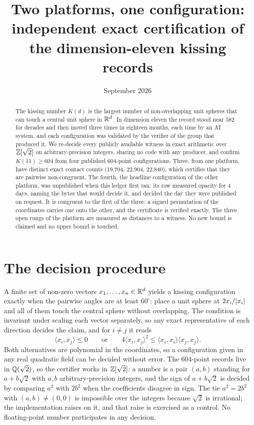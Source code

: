 \documentclass[11pt]{article}
\title{Two platforms, one configuration:\\ independent exact certification of the dimension-eleven kissing records}
\author{\cmauthor}
\date{September 2026}
\begin{document}
\maketitle

\begin{abstract}
The kissing number $K(d)$ is the largest number of non-overlapping unit spheres
that can touch a central unit sphere in $\mathbb{R}^d$. In dimension eleven the record
stood near $582$ for decades and then moved three times in eighteen months, each
time by an AI system, and each configuration was validated by the verifier of
the group that produced it. We re-decide every publicly available witness in
exact arithmetic over $\mathbb{Z}[\sqrt2]$ on arbitrary-precision integers, sharing no
code with any producer, and confirm $K(11) \ge 604$ from four published
$604$-point configurations. Three, from one platform, have distinct exact
contact counts (19,704, 22,904, 22,840),
which certifies that they are pairwise non-congruent. The fourth, the headline
configuration of the other platform, was unpublished when this ledger first
ran: its row measured opacity for 4 days, naming the bytes that
would decide it, and decided the day they were published on request. It is
congruent to the first of the three: a signed permutation of the coordinates
carries one onto the other, and the certificate is verified exactly. The three
open rungs of the platform are measured as distances to a witness. No new
bound is claimed and no upper bound is touched.
\end{abstract}

\section{The decision procedure}

A finite set of non-zero vectors $x_1,\dots,x_n \in \mathbb{R}^d$ yields a kissing
configuration exactly when the pairwise angles are at least $60^\circ$: place a
unit sphere at $2x_i/\lvert x_i \rvert$ and all of them touch the central sphere without
overlapping. The condition is invariant under scaling each vector separately, so
any exact representative of each direction decides the claim, and for $i \ne j$
it reads
\[
  \langle x_i, x_j\rangle \le 0
  \qquad\text{or}\qquad
  4\langle x_i, x_j\rangle^2 \le \langle x_i,x_i\rangle\langle x_j,x_j\rangle .
\]
Both alternatives are polynomial in the coordinates, so a configuration given in
any real quadratic field can be decided without error. The $604$-point records
live in $\mathbb{Q}(\sqrt2)$, so the certifier works in $\mathbb{Z}[\sqrt2]$: a number is a pair
$(a,b)$ standing for $a + b\sqrt2$ with $a,b$ arbitrary-precision integers, and
the sign of $a + b\sqrt2$ is decided by comparing $a^2$ with $2b^2$ when the
coefficients disagree in sign. The tie $a^2 = 2b^2$ with $(a,b) \ne (0,0)$ is
impossible over the integers because $\sqrt2$ is irrational; the implementation
raises on it, and that raise is exercised as a control. No floating-point number
participates in any decision.
\end{document}
